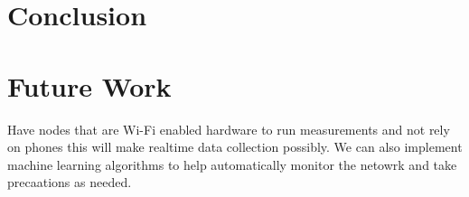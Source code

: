 \section{Conclusion}\label  {sec:conclusion}
\section{Future Work}\label{sec:future-work}
Have nodes that are Wi-Fi enabled hardware to run measurements and not rely on phones this will make realtime data collection possibly.
We can also implement machine learning algorithms to help automatically monitor the netowrk and take precaations as needed.

